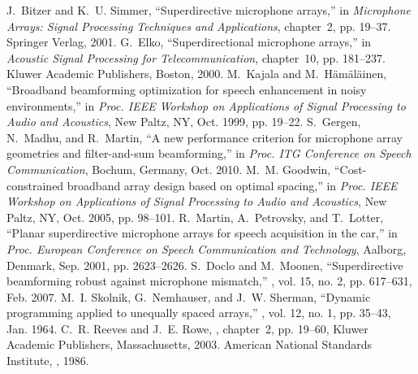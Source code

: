 \documentclass[9pt]{article}
\begin{document}
\begin{thebibliography}{10}

J.~Bitzer and K.~U. Simmer,
\newblock ``Superdirective microphone arrays,''
\newblock in {\em Microphone Arrays: Signal Processing Techniques and
  Applications}, chapter~2, pp. 19--37. Springer Verlag, 2001.
\vspace{-0.45cm}
G.~Elko,
\newblock ``Superdirectional microphone arrays,''
\newblock in {\em Acoustic Signal Processing for Telecommunication},
  chapter~10, pp. 181--237. Kluwer Academic Publishers, Boston, 2000.
\vspace{-0.05cm}
M.~Kajala and M.~H\"am\"al\"ainen,
\newblock ``Broadband beamforming optimization for speech enhancement in noisy
  environments,''
\newblock in {\em Proc. IEEE Workshop on Applications of Signal Processing to
  Audio and Acoustics}, New Paltz, NY, Oct. 1999, pp. 19--22.
\vspace{-0.05cm}
S.~Gergen, N.~Madhu, and R.~Martin,
\newblock ``A new performance criterion for microphone array geometries and
  filter-and-sum beamforming,''
\newblock in {\em Proc. ITG Conference on Speech Communication}, Bochum,
  Germany, Oct. 2010.
\vspace{-0.05cm}
M.~M. Goodwin,
\newblock ``Cost-constrained broadband array design based on optimal spacing,''
\newblock in {\em Proc. IEEE Workshop on Applications of Signal Processing to
  Audio and Acoustics}, New Paltz, NY, Oct. 2005, pp. 98--101.
\vspace{-0.05cm}
R.~Martin, A.~Petrovsky, and T.~Lotter,
\newblock ``Planar superdirective microphone arrays for speech acquisition in
  the car,''
\newblock in {\em Proc. European Conference on Speech Communication and
  Technology}, Aalborg, Denmark, Sep. 2001, pp. 2623--2626.
\vspace{-0.05cm}
S.~Doclo and M.~Moonen,
\newblock ``Superdirective beamforming robust against microphone mismatch,''
,
  vol. 15, no. 2, pp. 617--631, Feb. 2007.
\vspace{-0.05cm}
M.~I. Skolnik, G.~Nemhauser, and J.~W. Sherman,
\newblock ``Dynamic programming applied to unequally spaced arrays,''
, vol. 12, no. 1,
  pp. 35--43, Jan. 1964.
\vspace*{-0.45cm}
C.~R. Reeves and J.~E. Rowe,
, chapter~2,
  pp. 19--60,
\newblock Kluwer Academic Publishers, Massachusetts, 2003.
\vspace{-0.05cm}
American National Standards Institute,
, 1986.
\vspace{-0.05cm}
\end{thebibliography}
\end{document}
